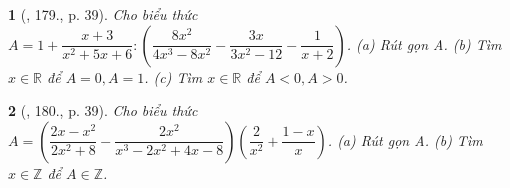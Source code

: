 \documentclass{article}
\newtheorem{baitoan}{}
\begin{document}
\begin{baitoan}[\cite{Tuyen_Toan_8}, 179., p. 39]
	Cho biểu thức $A = 1 + \dfrac{x + 3}{x^2 + 5x + 6}:\left(\dfrac{8x^2}{4x^3 - 8x^2} - \dfrac{3x}{3x^2 - 12} - \dfrac{1}{x + 2}\right)$. (a) Rút gọn A. (b) Tìm $x\in\mathbb{R}$ để $A = 0,A = 1$. (c) Tìm $x\in\mathbb{R}$ để $A < 0,A > 0$.
\end{baitoan}

\begin{baitoan}[\cite{Tuyen_Toan_8}, 180., p. 39]
	Cho biểu thức $A = \left(\dfrac{2x - x^2}{2x^2 + 8} - \dfrac{2x^2}{x^3 - 2x^2 + 4x - 8}\right)\left(\dfrac{2}{x^2} + \dfrac{1 - x}{x}\right)$. (a) Rút gọn A. (b) Tìm $x\in\mathbb{Z}$ để $A\in\mathbb{Z}$.
\end{baitoan}


\printbibliography[heading=bibintoc]
	
\end{document}
